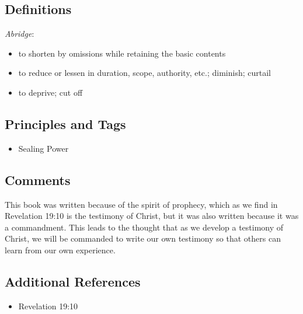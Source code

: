 \documentclass[12pt]{report}
\begin{document}
\subsection{Definitions\label{titlePage:DFN2}}
\emph{Abridge}: \begin{itemize}
\item to shorten by omissions while retaining the basic contents
\item to reduce or lessen in duration, scope, authority, etc.; diminish; curtail
\item to deprive; cut off
\end{itemize}
\subsection{Principles and Tags\label{titlePage:principles2}}
\begin{itemize}
\item {}Sealing Power
\end{itemize}

\subsection{Comments\label{titlePage:comments2}}
This book was written because of the spirit of prophecy, which as we find in Revelation 19:10 is the testimony of Christ, but it was also written because it was a commandment.  This leads to the thought that as we develop a testimony of Christ, we will be commanded to write our own testimony so that others can learn from our own experience.

\subsection{Additional References\label{titlePage:references2}}
\begin{itemize}
\item Revelation 19:10
\end{itemize}

\end{document}
